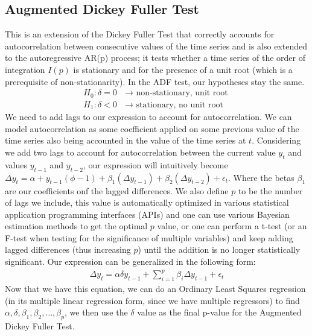 \documentclass{article}
\begin{document}
\begin{spacing}{2.0}
\subsection{Augmented Dickey Fuller Test}

This is an extension of the Dickey Fuller Test that correctly accounts for autocorrelation between consecutive values of the time series and is also extended to the autoregressive
AR(p) process; it tests whether a time series of the order of integration $I(p)$ is stationary and for the presence of a unit root (which is a prerequisite of non-stationarity).
In the ADF test, our hypotheses stay the same.
\begin{gather*}
    H_{0} : \delta = 0 \text{ $\rightarrow$ non-stationary, unit root} \\
    H_{1} : \delta < 0 \text{ $\rightarrow$ stationary, no unit root}
\end{gather*}
We need to add lags to our expression to account for autocorrelation. We can model autocorrelation as some coefficient applied on some previous value of the time series also being
accounted in the value of the time series at $t$. Considering we add two lags to account for autocorrelation between the current value $y_{t}$ and values $y_{t - 1}$ and $y_{t - 2}$,
our expression will intuitively become $\Delta y_{t} = \alpha + y_{t - 1} (\phi - 1) + \beta_{1}(\Delta y_{t - 1}) + \beta_{2}(\Delta y_{t - 2}) + \epsilon_{t}$. Where the betas $\beta_{1}$
are our coefficients onf the lagged differences. We also define $p$ to be the number of lags we include, this value is automatically optimized in various statistical application
programming interfaces (APIs) and one can use various Bayesian estimation methods to get the optimal $p$ value, or one can perform a t-test (or an F-test when testing for the significance
of multiple variables) and keep adding lagged differences (thus increasing $p$) until the addition is no longer statistically significant. Our expression can be generalized in the
following form:
\begin{gather*}
    \Delta y_{t} = \alpha \delta y_{t - 1} + \sum_{i = 1}^{p} \beta_{i} \Delta y_{t - 1} + \epsilon_{t}
\end{gather*}
Now that we have this equation, we can do an Ordinary Least Squares regression (in its multiple linear regression form, since we have multiple regressors) to find
$\alpha, \delta, \beta_{1}, \beta_{2}, \dots, \beta_{p}$, we then use the $\delta$ value as the final p-value for the Augmented Dickey Fuller Test.


\end{spacing}
\end{document}
